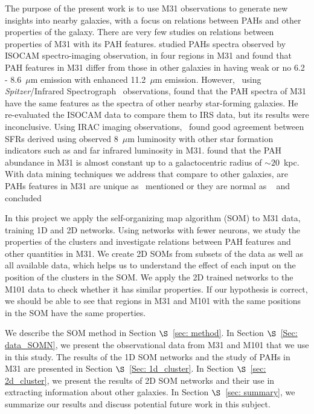 The purpose of the present work is to use M31 observations to generate new insights into nearby galaxies, with a focus on relations between PAHs and other properties of the galaxy.
There are very few studies on relations between properties of M31 with its PAH features. %
\cite{Cesarsky98} studied PAHs spectra observed by ISOCAM spectro-imaging observation, in four regions in M31 and found that PAH features in M31 differ from those in other galaxies in having weak or no 6.2 - 8.6~$\mu$m emission with enhanced 11.2~$\mu$m emission. 
However,~\cite{Dim15} using {\it Spitzer}/Infrared Spectrograph~\citep[IRS;][]{Houck04b} observations, found that the PAH spectra of M31 have the same features as the spectra of other nearby star-forming galaxies.
He re-evaluated the ISOCAM data to compare them to IRS data, but its results were inconclusive. %
Using IRAC imaging observations,~\cite{Barmby06} found good agreement between SFRs derived using observed 8~$\mu$m luminosity with other 
star formation indicators such as \halpha and far infrared luminosity in M31.
\cite{Draine14} found that the PAH abundance in M31 is almost constant up to a galactocentric radius of $\sim 20$~kpc.
With data mining techniques we address that
compare to other galaxies, are PAHs features in M31 are unique as~\cite{Cesarsky98} mentioned or they are normal as ~\cite{Dim15} and \cite{Draine14} concluded


In this project we apply the self-organizing map algorithm (SOM) to M31 data, training 1D and 2D networks.
Using networks with fewer neurons, we study the properties of the clusters and investigate relations between PAH features and other quantities in M31.
We create 2D SOMs from subsets of the data as well as all available data, which helps us to understand the effect of each input on the position of the clusters in the SOM.
We apply the 2D trained networks to the M101 data to check whether it has similar properties.
If our hypothesis is correct, we should be able to see that regions in M31 and M101 with the same positions in the SOM have the same properties.


We describe the SOM method in Section $\S$~\ref{sec: method}. 
In Section $\S$~\ref{Sec: data_SOMN}, we present the observational data from M31 and M101 that we use in this study.
The results of the 1D SOM networks and the study of PAHs in M31 are presented in Section $\S$~\ref{Sec: 1d_cluster}.
In Section $\S$~\ref{sec: 2d_cluster}, we present the results of 2D SOM networks and their use in extracting information about other galaxies.
In Section $\S$~\ref{sec: summary}, we summarize our results and discuss potential future work in this subject.